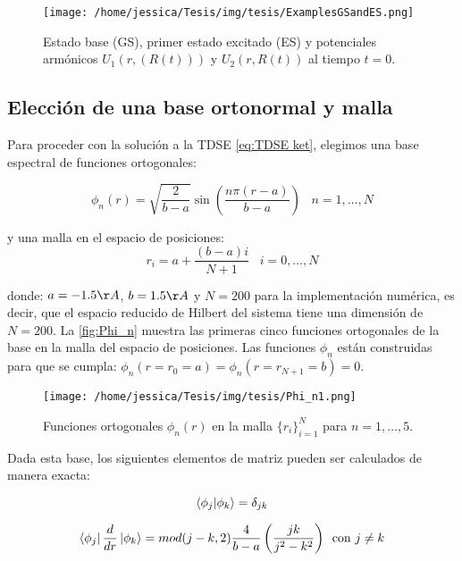 \begin{figure}[ht]
  \centering
  \texttt{[image: /home/jessica/Tesis/img/tesis/ExamplesGSandES.png]}
  \caption{Estado base (GS), primer estado excitado (ES) y potenciales armónicos $U_1(r,(R(t)))$ y $U_2(r, R(t))$ al tiempo $t=0$.}
  \label{fig:drawGSandES}
\end{figure}


\subsection{Elección de una base ortonormal y malla}

Para proceder con la solución a la \acs{TDSE} \autoref{eq:TDSE ket}, elegimos una base espectral de funciones ortogonales: \cite{Colbert1992}

\begin{equation}
  \label{eq:eigenfunc}
  \phi_n(r)=\sqrt{\frac{2}{b-a}}\sin\left( \frac{n\pi(r-a)}{b-a}\right) \,\,\,\,\, n=1,\dots,N
\end{equation}

y una malla en el espacio de posiciones:
\begin{equation}
  \label{eq:grid}
  r_i = a + \frac{(b-a)i}{N+1} \,\,\,\,\, i=0,\dots,N
\end{equation}

donde: $a=-1.5\AA$, $b=1.5\AA$ y $N=200$ para la implementación numérica, es decir, que el espacio reducido de Hilbert del sistema tiene una dimensión de $N=200$. La \autoref{fig:Phi_n} muestra las primeras cinco funciones ortogonales de la base en la malla del espacio de posiciones. Las funciones $\phi_n$ están construidas para que se cumpla: $\phi_n(r=r_0=a)=\phi_n(r=r_{N+1}=b)=0$.

\begin{figure}[ht]
  \centering
  \texttt{[image: /home/jessica/Tesis/img/tesis/Phi\_n1.png]}
  \caption{Funciones ortogonales $\phi_n(r)$ en la malla $\{r_i\}_{i=1}^{N}$ para $n=1,\dots,5$.}
  \label{fig:Phi_n}
\end{figure}

Dada esta base, los siguientes elementos de matriz pueden ser calculados de manera exacta:

\begin{equation}
  \label{eq:trash}
  \bra{\phi_j}\ket{\phi_k} = \delta_{jk}
\end{equation}

\begin{equation}
  \label{eq:trash1}
  \bra{\phi_j}\frac{d}{d r}\ket{\phi_k} = mod(j-k,2)\frac{4}{b-a}\left(\frac{jk}{j^2 - k^2}\right)\,\,\,\text{con } j\neq k
\end{equation}

